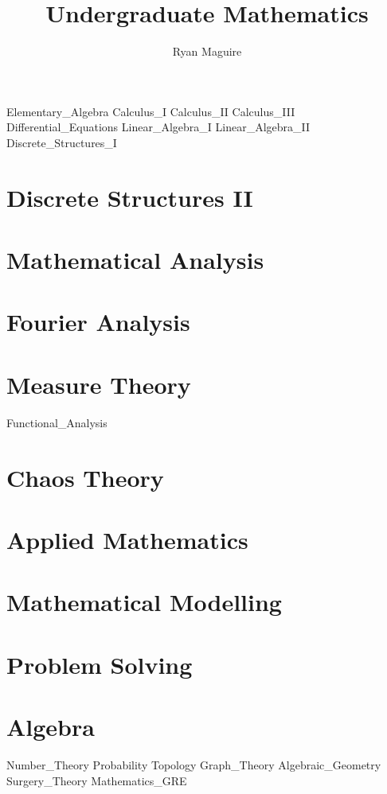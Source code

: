 \documentclass[crop=false,class=book,oneside]{standalone}
\begin{document}
    \newif\ifmathcourses
    \ifx\ifcourses\undefined
        \title{Undergraduate Mathematics}
        \author{Ryan Maguire}
        \date{\vspace{-5ex}}
        \maketitle
        \tableofcontents
        \listoffigures
        \listoftables
        \clearpage
    \fi
    {Elementary_Algebra}
    {Calculus_I}
    {Calculus_II}
    {Calculus_III}
    {Differential_Equations}
    {Linear_Algebra_I}
    {Linear_Algebra_II}
    {Discrete_Structures_I}
    \chapter{Discrete Structures II}
    \chapter{Mathematical Analysis}
    \chapter{Fourier Analysis}
    \chapter{Measure Theory}
    {Functional_Analysis}
    \chapter{Chaos Theory}
    \chapter{Applied Mathematics}
    \chapter{Mathematical Modelling}
    \chapter{Problem Solving}
    \chapter{Algebra}
    {Number_Theory}
    {Probability}
    {Topology}
    {Graph_Theory}
    {Algebraic_Geometry}
    {Surgery_Theory}
    {Mathematics_GRE}
\end{document}
